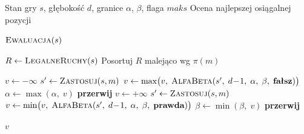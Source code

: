 \documentclass[12pt,a4paper]{article}
\begin{document}
\begin{algorithm}[H]
\caption{Minimax z~odcięciami alfa-beta}\label{alg:alphabeta}
\begin{algorithmic}[1]

\Require Stan gry $s$, głębokość $d$, granice $\alpha$, $\beta$, flaga $\mathit{maks}$
\Ensure  Ocena najlepszej osiągalnej pozycji

\Statex
{}
    \State \Return $\textsc{Ewaluacja}(s)$
\EndIf

\Statex
\State $R \gets \textsc{LegalneRuchy}(s)$
\State Posortuj $R$ malejąco wg $\pi(m)$

\Statex
{}
    \State $v \gets -\infty$
        \State $s' \gets \textsc{Zastosuj}(s, m)$
        \State $v \gets \max\bigl(v,\; \textsc{AlfaBeta}(s',\; d\!-\!1,\; \alpha,\; \beta,\; \textbf{fałsz})\bigr)$
        \State $\alpha \gets \max(\alpha,\; v)$
        \If{$\alpha \geq \beta$}
            \State \textbf{przerwij}
        \EndIf
    \EndFor
\Else
    \State $v \gets +\infty$
        \State $s' \gets \textsc{Zastosuj}(s, m)$
        \State $v \gets \min\bigl(v,\; \textsc{AlfaBeta}(s',\; d\!-\!1,\; \alpha,\; \beta,\; \textbf{prawda})\bigr)$
        \State $\beta \gets \min(\beta,\; v)$
        \If{$\alpha \geq \beta$}
            \State \textbf{przerwij}
        \EndIf
    \EndFor
\EndIf

\Statex
\State \Return $v$

\end{algorithmic}
\end{algorithm}


\end{document}
